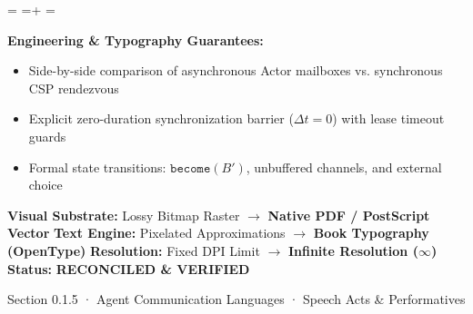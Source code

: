\documentclass[10pt,a4paper,landscape]{article}
\newcommand{\pdautoscale}[2]{%
  \pdmaxh=#1\relax
  \pdmaxw=#2\relax
  \sbox{\pdscaledbox}{\usebox{\pdfigbox}}%
  \pdcurh=\dimexpr\ht\pdscaledbox+\dp\pdscaledbox\relax
  \pdcurw=\wd\pdscaledbox
  \ifdim\dimexpr\pdcurw * 100 / \pdmaxw\relax > \dimexpr\pdcurh * 100 / \pdmaxh\relax
    \resizebox{\pdmaxw}{!}{\usebox{\pdscaledbox}}%
  \else
    \resizebox{!}{\pdmaxh}{\usebox{\pdscaledbox}}%
  \fi
}
\begin{document}
\begin{minipage}[t]{0.492\linewidth}
  \begin{tcolorbox}[
    colback=pdcobalt!3,colframe=pdcobalt!85!black,arc=1.5pt,
    boxrule=0.7pt,top=1.5pt,bottom=1.5pt,left=4pt,right=4pt,
    title={\pdgrotesk\footnotesize\bfseries \color{white} B. Authoritative Native Vector Replacement \hfill \texttt{.tex / TikZ / PGF}}
  ]
    \begin{minipage}[c][8.3cm][c]{\linewidth}
      \centering
      \sbox{\pdfigbox}{}
      \pdautoscale{8.0cm}{\linewidth}
    \end{minipage}
    \tcblower
    \begin{minipage}[t][2.0cm][t]{\linewidth}
      \pdgrotesk\scriptsize
      \textbf{{\color{pdcobalt} Engineering \& Typography Guarantees:}}\\
      \begin{itemize}[leftmargin=9pt,itemsep=0pt,topsep=0.5pt,parsep=0pt]
        \item Side-by-side comparison of asynchronous Actor mailboxes vs. synchronous CSP rendezvous
        \item Explicit zero-duration synchronization barrier ($\Delta t = 0$) with lease timeout guards
        \item Formal state transitions: $\mathtt{become}(B')$, unbuffered channels, and external choice
      \end{itemize}
    \end{minipage}
  \end{tcolorbox}
\end{minipage}

\vspace*{0.05cm}
\noindent
\begin{tcolorbox}[
  colback=hhpaper,colframe=hhgray!35,arc=1.5pt,boxrule=0.4pt,
  top=1.5pt,bottom=1.5pt,left=6pt,right=6pt
]
  \pdgrotesk\scriptsize
  \noindent
  \textbf{Visual Substrate:} Lossy Bitmap Raster $\rightarrow$ \textbf{\color{pdcobalt}Native PDF / PostScript Vector}\hfill
  \textbf{Text Engine:} Pixelated Approximations $\rightarrow$ \textbf{\color{pdcobalt}Book Typography (OpenType)}\hfill
  \textbf{Resolution:} Fixed DPI Limit $\rightarrow$ \textbf{\color{pdcobalt}Infinite Resolution ($\infty$)}\hfill
  \textbf{Status:} \textbf{\color{pdteal}RECONCILED \& VERIFIED}
\end{tcolorbox}
\clearpage

\noindent
\begin{minipage}[t]{\linewidth}
  \hfill
  {\pdgrotesk\footnotesize\color{hhgray} Section 0.1.5 · Agent Communication Languages · Speech Acts \& Performatives}\\
  \vspace*{0.03cm}
  \noindent{\color{hhgray!40}\rule{\linewidth}{0.5pt}}
\end{minipage}
\end{document}
